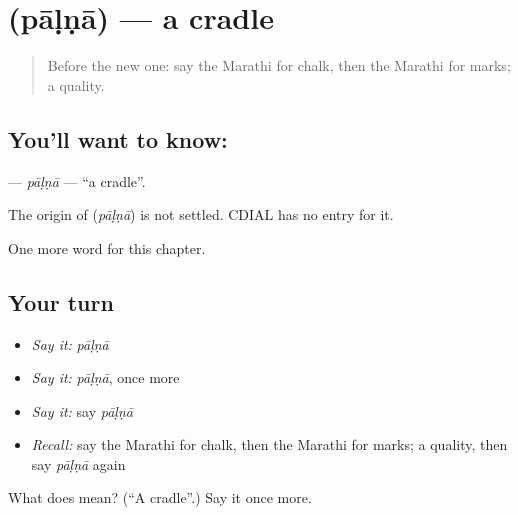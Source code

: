 \section[\texorpdfstring{\mr{पाळणा} (pāḷṇā)}{पाळणा (pāḷṇā)}]{ (pāḷṇā) — a cradle}

\label{lesson:MR-C221-palna}



\begin{quote}
Before the new one: say the Marathi for chalk, then the Marathi for marks; a quality.
\end{quote}

\subsection*{You'll want to know: }
\textbf{} — \emph{pāḷṇā} — \textquotedblleft{}a cradle\textquotedblright{}.

\begin{cousinweb}
The origin of \textbf{} (\emph{pāḷṇā}) is not settled. CDIAL has no entry for it.
\end{cousinweb}

\begin{grammarlens}[title={What you've built}]
One more word for this chapter.
\end{grammarlens}

\subsection*{Your turn}
\begin{itemize}
\raggedright
  \item \emph{Say it:} \emph{pāḷṇā}
  \item \emph{Say it:} \emph{pāḷṇā}, once more
  \item \emph{Say it:} say \emph{pāḷṇā}
  \item \emph{Recall:} say the Marathi for chalk, then the Marathi for marks; a quality, then say \emph{pāḷṇā} again
\end{itemize}

\begin{tcolorbox}[breakable,colback=teal!4,colframe=teal!35!black,title={Before you move on}]
What does  mean? (\textquotedblleft{}A cradle\textquotedblright{}.) Say it once more.
\end{tcolorbox}
